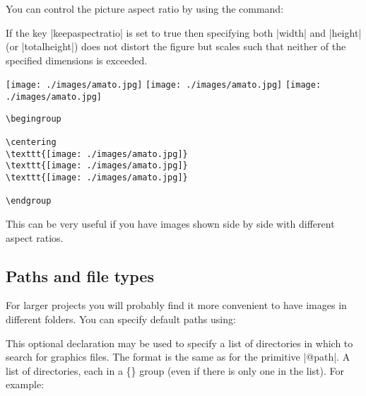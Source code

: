 You can control the picture aspect ratio by using the command:

\begin{commands}[]{}
\end{commands}

If the key |keepaspectratio| is set to true then specifying 
both |width| and |height| (or |totalheight|) does not distort the ﬁgure but 
scales such that neither of the speciﬁed dimensions is exceeded.

\medskip
\begin{commands}[]{}
\begingroup

\centering
\texttt{[image: ./images/amato.jpg]}
\texttt{[image: ./images/amato.jpg]}
\texttt{[image: ./images/amato.jpg]}

\endgroup

\begin{verbatim}
\begingroup

\centering
\texttt{[image: ./images/amato.jpg]}
\texttt{[image: ./images/amato.jpg]}
\texttt{[image: ./images/amato.jpg]}

\endgroup

\end{verbatim}
\end{commands}

This can be very useful if you have images shown side by side with different
aspect ratios. 


\subsection{Paths and file types}

For larger projects you will probably find it more convenient to have 
images in different folders. You can specify default paths using:


\CMDI{\graphicspath}

This optional declaration may be used to specify a list of directories in which to
search for graphics ﬁles. The format is the same as for the \latexe primitive
|@path|. A list of directories, each in a \{\} group (even if there is only one
in the list). For example:




